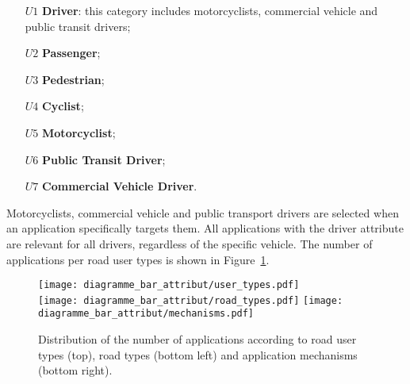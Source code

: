 \begin{enumerate}
\item[$U1$] \textbf{Driver}: this category includes motorcyclists, commercial vehicle and public transit drivers; 
\item[$U2$] \textbf{Passenger};
\item[$U3$] \textbf{Pedestrian};
\item[$U4$] \textbf{Cyclist};
\item[$U5$] \textbf{Motorcyclist};
\item[$U6$] \textbf{Public Transit Driver};
\item[$U7$] \textbf{Commercial Vehicle Driver}.
\end{enumerate}

Motorcyclists, commercial vehicle and public transport drivers are selected when an application specifically targets them. All applications with the driver attribute are relevant for all drivers, regardless of the specific vehicle. 
The number of applications per road user types is shown in Figure~\ref{fig:nb-app-attribut}. 

\begin{figure}[ht!]
  \begin{center}
    \texttt{[image: diagramme\_bar\_attribut/user\_types.pdf]}\\
    \texttt{[image: diagramme\_bar\_attribut/road\_types.pdf]}
    \texttt{[image: diagramme\_bar\_attribut/mechanisms.pdf]}
    \caption{Distribution of the number of applications according to road user types (top), road types (bottom left) and application mechanisms (bottom right).}
    \label{fig:nb-app-attribut}
  \end{center}
\end{figure}


